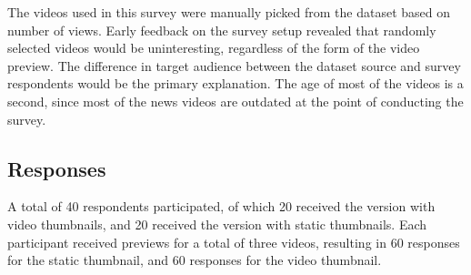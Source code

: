 \documentclass{../resources/acm_proc_article-sp}
\begin{document}
The videos used in this survey were manually picked from the dataset based on number of views. Early feedback on the survey setup revealed that randomly selected videos would be uninteresting, regardless of the form of the video preview. The difference in target audience between the dataset source and survey respondents would be the primary explanation. The age of most of the videos is a second, since most of the news videos are outdated at the point of conducting the survey.

\subsection{Responses}

A total of 40 respondents participated, of which 20 received the version with video thumbnails, and 20 received the version with static thumbnails. Each participant received previews for a total of three videos, resulting in 60 responses for the static thumbnail, and 60 responses for the video thumbnail.
\end{document}
